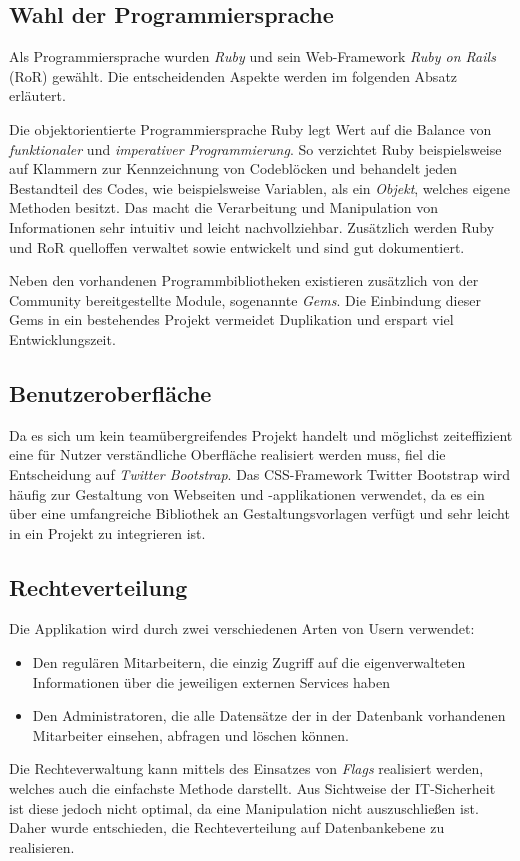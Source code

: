 
\subsection{Wahl der Programmiersprache}
\label{sec:Wahl der Programmiersprache}
Als Programmiersprache wurden \textit{Ruby} und sein Web-Framework \textit{Ruby on Rails} (RoR) gewählt.
Die entscheidenden Aspekte werden im folgenden Absatz erläutert.

Die objektorientierte Programmiersprache Ruby legt Wert auf die Balance von \textit{funktionaler} und
\textit{imperativer Programmierung}. So verzichtet Ruby beispielsweise auf Klammern zur Kennzeichnung
von Codeblöcken und behandelt jeden Bestandteil des Codes, wie beispielsweise Variablen, als ein \textit{Objekt},
welches eigene Methoden besitzt. Das macht die Verarbeitung und Manipulation von Informationen sehr
intuitiv und leicht nachvollziehbar. Zusätzlich werden Ruby und \acs{RoR}
quelloffen verwaltet sowie entwickelt und sind gut dokumentiert.

Neben den vorhandenen Programmbibliotheken existieren zusätzlich von der Community bereitgestellte Module,
sogenannte \textit{Gems}. Die Einbindung dieser Gems in ein bestehendes Projekt vermeidet
Duplikation und erspart viel Entwicklungszeit.

\subsection{Benutzeroberfläche}
\label{sec:Benutzeroberfläche}
Da es sich um kein teamübergreifendes Projekt handelt und möglichst zeiteffizient
eine für Nutzer verständliche Oberfläche realisiert werden muss, fiel die Entscheidung auf
\textit{Twitter Bootstrap}.
Das CSS-Framework Twitter Bootstrap wird häufig zur Gestaltung von Webseiten und
-applikationen verwendet, da es ein über eine umfangreiche Bibliothek an Gestaltungsvorlagen
verfügt und sehr leicht in ein Projekt zu integrieren ist.

\subsection{Rechteverteilung}
\label{sec:Rechteverteilung}
Die Applikation wird durch zwei verschiedenen Arten von Usern verwendet:
\begin{itemize}
	\item Den regulären Mitarbeitern, die einzig Zugriff auf die eigenverwalteten Informationen über die jeweiligen externen Services haben
	\item Den Administratoren, die alle Datensätze der in der Datenbank vorhandenen Mitarbeiter einsehen, abfragen und löschen können.
\end{itemize}
Die Rechteverwaltung kann mittels des Einsatzes von \textit{Flags}
realisiert werden, welches auch die einfachste Methode darstellt. Aus Sichtweise der IT-Sicherheit ist diese jedoch nicht optimal, da eine
Manipulation nicht auszuschließen ist.
Daher wurde entschieden, die Rechteverteilung auf Datenbankebene zu realisieren.

